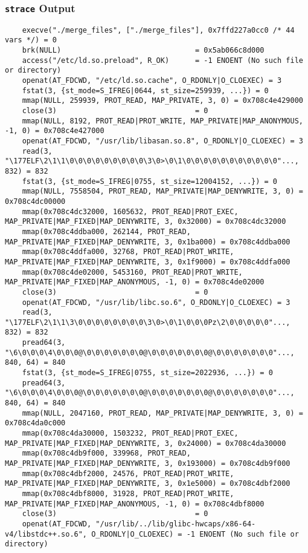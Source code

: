 \documentclass[12pt]{article}
\begin{document}
	\subsubsection*{\texttt{strace} Output}
	\begin{verbatim}
	execve("./merge_files", ["./merge_files"], 0x7ffd227a0cc0 /* 44 vars */) = 0
	brk(NULL)                               = 0x5ab066c8d000
	access("/etc/ld.so.preload", R_OK)      = -1 ENOENT (No such file or directory)
	openat(AT_FDCWD, "/etc/ld.so.cache", O_RDONLY|O_CLOEXEC) = 3
	fstat(3, {st_mode=S_IFREG|0644, st_size=259939, ...}) = 0
	mmap(NULL, 259939, PROT_READ, MAP_PRIVATE, 3, 0) = 0x708c4e429000
	close(3)                                = 0
	mmap(NULL, 8192, PROT_READ|PROT_WRITE, MAP_PRIVATE|MAP_ANONYMOUS, -1, 0) = 0x708c4e427000
	openat(AT_FDCWD, "/usr/lib/libasan.so.8", O_RDONLY|O_CLOEXEC) = 3
	read(3, "\177ELF\2\1\1\0\0\0\0\0\0\0\0\0\3\0>\0\1\0\0\0\0\0\0\0\0\0\0\0"..., 832) = 832
	fstat(3, {st_mode=S_IFREG|0755, st_size=12004152, ...}) = 0
	mmap(NULL, 7558504, PROT_READ, MAP_PRIVATE|MAP_DENYWRITE, 3, 0) = 0x708c4dc00000
	mmap(0x708c4dc32000, 1605632, PROT_READ|PROT_EXEC, MAP_PRIVATE|MAP_FIXED|MAP_DENYWRITE, 3, 0x32000) = 0x708c4dc32000
	mmap(0x708c4ddba000, 262144, PROT_READ, MAP_PRIVATE|MAP_FIXED|MAP_DENYWRITE, 3, 0x1ba000) = 0x708c4ddba000
	mmap(0x708c4ddfa000, 32768, PROT_READ|PROT_WRITE, MAP_PRIVATE|MAP_FIXED|MAP_DENYWRITE, 3, 0x1f9000) = 0x708c4ddfa000
	mmap(0x708c4de02000, 5453160, PROT_READ|PROT_WRITE, MAP_PRIVATE|MAP_FIXED|MAP_ANONYMOUS, -1, 0) = 0x708c4de02000
	close(3)                                = 0
	openat(AT_FDCWD, "/usr/lib/libc.so.6", O_RDONLY|O_CLOEXEC) = 3
	read(3, "\177ELF\2\1\1\3\0\0\0\0\0\0\0\0\3\0>\0\1\0\0\0Pz\2\0\0\0\0\0"..., 832) = 832
	pread64(3, "\6\0\0\0\4\0\0\0@\0\0\0\0\0\0\0@\0\0\0\0\0\0\0@\0\0\0\0\0\0\0"..., 840, 64) = 840
	fstat(3, {st_mode=S_IFREG|0755, st_size=2022936, ...}) = 0
	pread64(3, "\6\0\0\0\4\0\0\0@\0\0\0\0\0\0\0@\0\0\0\0\0\0\0@\0\0\0\0\0\0\0"..., 840, 64) = 840
	mmap(NULL, 2047160, PROT_READ, MAP_PRIVATE|MAP_DENYWRITE, 3, 0) = 0x708c4da0c000
	mmap(0x708c4da30000, 1503232, PROT_READ|PROT_EXEC, MAP_PRIVATE|MAP_FIXED|MAP_DENYWRITE, 3, 0x24000) = 0x708c4da30000
	mmap(0x708c4db9f000, 339968, PROT_READ, MAP_PRIVATE|MAP_FIXED|MAP_DENYWRITE, 3, 0x193000) = 0x708c4db9f000
	mmap(0x708c4dbf2000, 24576, PROT_READ|PROT_WRITE, MAP_PRIVATE|MAP_FIXED|MAP_DENYWRITE, 3, 0x1e5000) = 0x708c4dbf2000
	mmap(0x708c4dbf8000, 31928, PROT_READ|PROT_WRITE, MAP_PRIVATE|MAP_FIXED|MAP_ANONYMOUS, -1, 0) = 0x708c4dbf8000
	close(3)                                = 0
	openat(AT_FDCWD, "/usr/lib/../lib/glibc-hwcaps/x86-64-v4/libstdc++.so.6", O_RDONLY|O_CLOEXEC) = -1 ENOENT (No such file or directory)

\end{verbatim}
\end{document}
